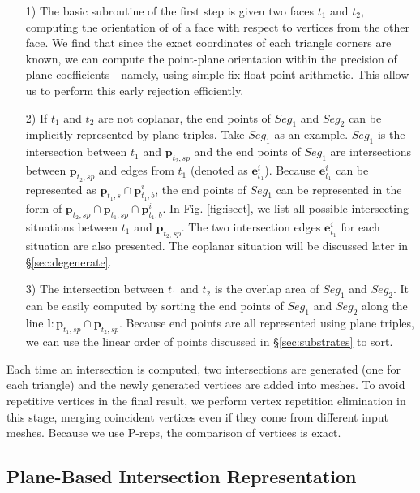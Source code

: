 \documentclass[10pt,journal,compsoc]{IEEEtran}
\begin{document}
\begin{itemize}[leftmargin=0.45cm]
  \item[1)] The basic subroutine of the first step is given two faces $t_1$ and $t_2$, computing the orientation of of a face with respect to vertices from the other face. We find that since the exact coordinates of each triangle corners are known, we can compute the point-plane orientation within the precision of plane coefficients---namely, using simple fix float-point arithmetic. This allow us to perform this early rejection efficiently.
      \vspace{0.5em}
  \item[2)] If $t_1$ and $t_2$ are not coplanar, the end points of $Seg_1$ and $Seg_2$ can be implicitly represented by plane triples. Take $Seg_1$ as an example. $Seg_1$ is the intersection between $t_1$ and $\bm{p}_{t_2, sp}$ and the end points of $Seg_1$ are intersections between $\bm{p}_{t_2, sp}$ and edges from $t_1$ (denoted as $\bm{e}^i_{t_1}$). Because $\bm{e}^i_{t_1}$ can be represented as $\bm{p}_{t_1, s}\cap \bm{p}^i_{t_1, b}$, the end points of $Seg_1$ can be represented in the form of $\bm{p}_{t_2, sp} \cap \bm{p}_{t_1, sp} \cap \bm{p}^i_{t_1, b}$. In Fig. \ref{fig:isect}, we list all possible intersecting situations between $t_1$ and $\bm{p}_{t_2, sp}$. The two intersection edges $\bm{e}^i_{t_1}$ for each situation are also presented. The coplanar situation will be discussed later in \S \ref{sec:degenerate}.
      \vspace{0.5em}
 \item[3)] The intersection between $t_1$ and $t_2$ is the overlap area of $Seg_1$ and $Seg_2$. It can be easily computed by sorting the end points of $Seg_1$ and $Seg_2$ along the line $\bm{l}\colon \bm{p}_{t_1, sp} \cap \bm{p}_{t_2, sp}$. Because end points are all represented using plane triples, we can use the linear order of points discussed in \S \ref{sec:substrates} to sort.
\end{itemize}

Each time an intersection is computed, two intersections are generated (one for each triangle) and the newly generated vertices are added into meshes. To avoid repetitive vertices in the final result, we perform vertex repetition elimination in this stage, merging coincident vertices even if they come from different input meshes. Because we use P-reps, the comparison of vertices is exact.

\subsection{Plane-Based Intersection Representation}
\label{sec:ir}
\end{document}
